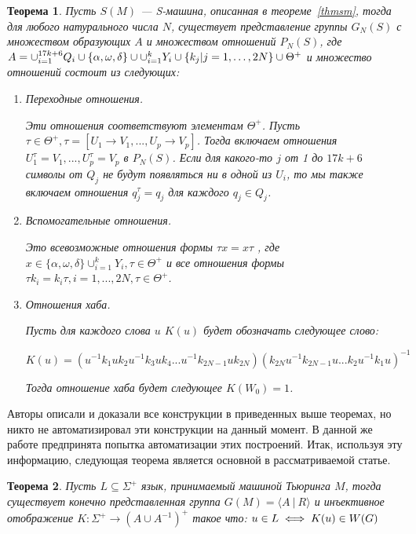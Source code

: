 \documentclass[14pt]{matmex-diploma-custom}
\newtheorem{thm}{Теорема}[subsection]
\begin{document}
\begin{thm} \label{sm2gr}
Пусть $ S (M) $ --- S-машина, описанная в теореме~\ref{thmsm},
тогда для любого натурального числа $ N $,
существует представление группы $ G_N (S) $
с множеством образующих $ A $ и множеством отношений $ P_N (S) $,
где
$\\
A = \cup^{17k+6}_{i=1} Q_i \cup \{\alpha, \omega, \delta\}
\cup \cup^k_{i=1}Y_i \cup \{k_j | j = 1, \dots, 2N\} \cup \Theta^+$
и множество отношений состоит из следующих:
\begin{enumerate}
    \item Переходные отношения. 
    
    Эти отношения соответствуют элементам $\Theta^+$.
Пусть $\tau \in \Theta^+, \tau = [U_1 \to V_1, ..., U_p → V_p]$. 
Тогда включаем отношения $U^{\tau}_1 = V_1, ..., U^{\tau}_p = V_p$ в $P_N(S)$. 
Если для какого-то $j$ от 1 до $17k + 6$ символы от $Q_j$ не будут появляться ни в одной из $U_i$, 
то мы также включаем отношения $q^{\tau}_j = q_j$ для каждого $q_j \in Q_j$.
    \item Вспомогательные отношения.

Это всевозможные отношения формы $\tau x = x \tau$ , где 
$x \in \{\alpha, \omega, \delta\} \cup^k_{i=1} Y_i, \tau \in \Theta^+$ и все отношения формы 
$\tau k_i = k_i\tau, i = 1, ..., 2N, \tau \in \Theta^+$.
    \item Отношения хаба.

Пусть для каждого слова $u$ $K(u)$ будет обозначать следующее слово:

$K(u) = (u^{−1}k_1uk_2u^{−1}k_3uk_4 . . . u^{−1}k_{2N−1}uk_{2N})(k_{2N}u^{−1}k_{2N−1}u . . . k_2u^{−1}k_1u)^{−1}$

Тогда отношение хаба будет следующее $K(W_0) = 1$.
\end{enumerate}
\end{thm}

Авторы описали и доказали все конструкции в приведенных выше теоремах,
но никто не автоматизировал эти конструкции на данный момент. В данной же работе предпринята попытка автоматизации этих построений. Итак, используя эту информацию, следующая теорема является основной в рассматриваемой статье.

\begin{thm} \label{basethm}
Пусть $L \subseteq \Sigma^+$ язык, принимаемый машиной Тьюринга $M$,
    тогда существует конечно представленная группа $G(M)=\langle A~|~R \rangle$
    и инъективное отображение $K: \Sigma^+ \to (A \cup A^{-1})^+$ такое что:
    $\\u \in L \iff K(u)\in W(G)$
\end{thm}
\end{document}
